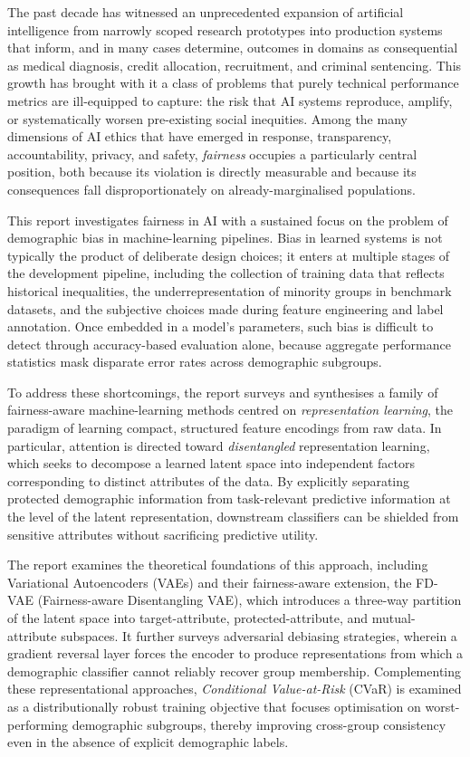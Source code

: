 \documentclass[a4paper,12pt,twoside]{report}
\begin{document}
The past decade has witnessed an unprecedented expansion of artificial
intelligence from narrowly scoped research prototypes into production
systems that inform, and in many cases determine, outcomes in domains
as consequential as medical diagnosis, credit allocation, recruitment,
and criminal sentencing.  This growth has brought with it a class of
problems that purely technical performance metrics are ill-equipped to
capture: the risk that AI systems reproduce, amplify, or systematically
worsen pre-existing social inequities.  Among the many dimensions of AI
ethics that have emerged in response, transparency, accountability,
privacy, and safety, \emph{fairness} occupies a particularly central
position, both because its violation is directly measurable and because
its consequences fall disproportionately on already-marginalised
populations.

This report investigates fairness in AI with a sustained focus on the
problem of demographic bias in machine-learning pipelines.  Bias in
learned systems is not typically the product of deliberate design
choices; it enters at multiple stages of the development pipeline,
including the collection of training data that reflects historical
inequalities, the underrepresentation of minority groups in benchmark
datasets, and the subjective choices made during feature engineering
and label annotation.  Once embedded in a model's parameters, such
bias is difficult to detect through accuracy-based evaluation alone,
because aggregate performance statistics mask disparate error rates
across demographic subgroups.

To address these shortcomings, the report surveys and synthesises a
family of fairness-aware machine-learning methods centred on
\emph{representation learning}, the paradigm of learning compact,
structured feature encodings from raw data.  In particular, attention
is directed toward \emph{disentangled} representation learning, which
seeks to decompose a learned latent space into independent factors
corresponding to distinct attributes of the data.  By explicitly
separating protected demographic information from task-relevant
predictive information at the level of the latent representation,
downstream classifiers can be shielded from sensitive attributes
without sacrificing predictive utility.

The report examines the theoretical foundations of this approach,
including Variational Autoencoders (VAEs) and their fairness-aware
extension, the FD-VAE (Fairness-aware Disentangling VAE), which
introduces a three-way partition of the latent space into
target-attribute, protected-attribute, and mutual-attribute subspaces.
It further surveys adversarial debiasing strategies, wherein a
gradient reversal layer forces the encoder to produce representations
from which a demographic classifier cannot reliably recover group
membership.  Complementing these representational approaches,
\emph{Conditional Value-at-Risk} (CVaR) is examined as a
distributionally robust training objective that focuses optimisation
on worst-performing demographic subgroups, thereby improving
cross-group consistency even in the absence of explicit demographic
labels.
\end{document}
